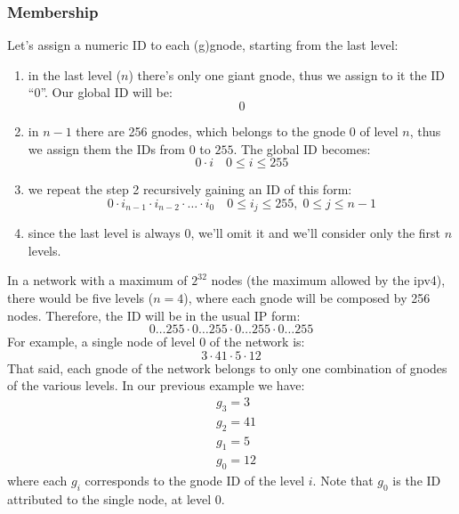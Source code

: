 \documentclass[a4paper]{article}
\begin{document}
\subsubsection{Membership}
Let's assign a numeric ID to each (g)gnode, starting from the last level:
\begin{enumerate}
	\item in the last level ($n$) there's only one giant gnode, thus we assign
		to it the ID ``0''. Our global ID will be:
		\[
		0
		\]
	\item in $n-1$ there are 256 gnodes, which belongs to the gnode 0 of
		level $n$, thus we assign them the IDs from $0$ to $255$.
		The global ID becomes:
		\[
		0\cdot i\quad 0\le  i\le 255
		\]
	\item we repeat the step 2 recursively gaining an ID of this form:
		\[
		0\cdot i_{n-1}\cdot i_{n-2}\cdot \dots \cdot i_0 \quad 0\le i_j\le 255,\;0\le j\le n-1
		\]
	\item since the last level is always $0$, we'll omit it and we'll
		consider only the first $n$ levels.
\end{enumerate}
In a network with a maximum of $2^{32}$ nodes (the maximum allowed by the ipv4),
there would be five levels ($n=4$), where each gnode will be composed by 256 nodes.
Therefore, the ID will be in the usual IP form:
\[
0\dots255\cdot 0\dots255\cdot 0\dots255\cdot 0\dots255
\]
For example, a single node of level 0 of the network is:
\[
3\cdot 41\cdot 5\cdot 12
\]
That said, each gnode of the network belongs to only one combination of gnodes
of the various levels. In our previous example we have:
\begin{align*}
	&g_3=3\\
	&g_2=41\\
	&g_1=5\\
	&g_0=12
\end{align*}
where each $g_i$ corresponds to the gnode ID of the level $i$. Note that $g_0$
is the ID attributed to the single node, at level 0.
\end{document}
